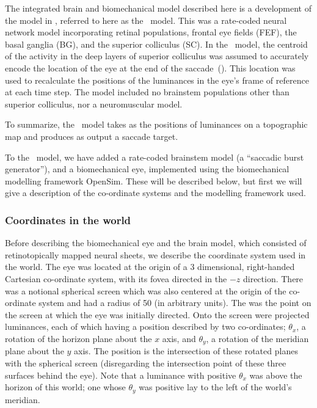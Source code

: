 \documentclass{frontiersSCNS}
\begin{document}
The integrated brain and biomechanical model described here is a
development of the model in \cite{cope_basal_2017},
referred to here as the \ccg~model. This was a rate-coded neural
network model incorporating retinal populations, frontal eye fields
(FEF), the basal ganglia (BG), and the superior colliculus (SC). In
the \ccg~model, the centroid of the activity in the deep
layers of superior colliculus was assumed to accurately encode the
location of the eye at the end of the
saccade~(\cite{wurtz_activity_1972,robinson_eye_1972,van_gisbergen_collicular_1987,mcilwain_lateral_1982}).
This location was used to recalculate the positions of the luminances in
the eye's frame of reference at each time step. The model included no
brainstem populations other than superior colliculus, nor a
neuromuscular model.

To summarize, the \ccg~model takes as  the positions
of luminances on a topographic map and produces as output a saccade 
target.

To the \ccg~model, we have added a rate-coded brainstem model (a ``saccadic
burst generator''), and a biomechanical eye, implemented using the
biomechanical modelling framework OpenSim. These will be described below,
but first we will give a description of the co-ordinate systems and the
modelling framework used.

\subsubsection{Coordinates in the world}

Before describing the biomechanical eye and the brain model, which consisted
of retinotopically mapped neural sheets, we describe the coordinate system
used in the world. The eye was located at the origin of a 3 dimensional, right-handed 
Cartesian co-ordinate system, with its fovea directed in the $-z$ direction. 
There was a notional spherical screen which was also centered at the origin of the
co-ordinate system and had a radius of 50 (in arbitrary units). The  was the point on the
screen at which the eye was initially directed.
Onto the screen were projected luminances, each of which having a position 
described by two co-ordinates; $\theta_x$, a 
rotation of the horizon plane about the $x$ axis, and $\theta_y$, a rotation 
of the meridian plane about the $y$ axis. The position is the intersection
of these rotated planes with the spherical screen (disregarding
the intersection point of these three surfaces behind the eye).
%
Note that a luminance with positive $\theta_x$ was above the horizon of this world; 
one whose $\theta_y$ was positive lay to the left of the world's meridian.
\end{document}
